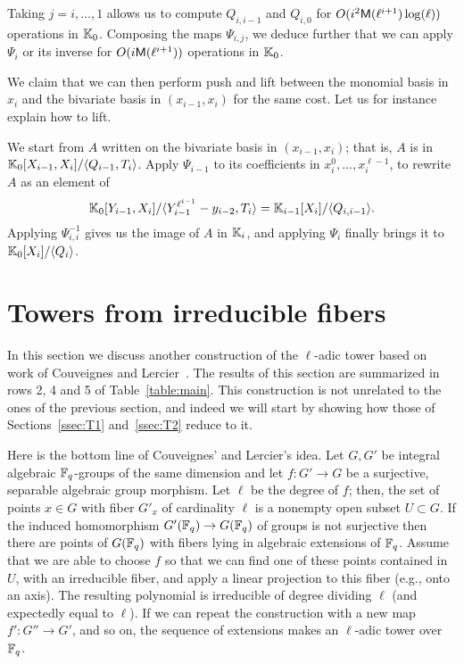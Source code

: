 \documentclass{sig-alternate}
\begin{document}
Taking $j=i,\dots,1$ allows us to compute $Q_{i,i-1}$ and $Q_{i,0}$
for $O(i^2\mathsf{M}(\ell^{i+1})\log(\ell))$ operations in $\mathbb{K}_0$. Composing
the maps $\Psi_{i,j}$, we deduce further that we can apply $\Psi_i$ or
its inverse for $O(i\mathsf{M}(\ell^{i+1}))$ operations in $\mathbb{K}_0$.  

We claim that we can then perform push and lift between the monomial
basis in $x_i$ and the bivariate basis in $(x_{i-1},x_i)$ for the same
cost. Let us for instance explain how to lift.

We start from $A$ written on the bivariate basis in $(x_{i-1},x_i)$;
that is, $A$ is in $\mathbb{K}_0[X_{i-1},X_i]/\langle Q_{i-1},
T_{i}\rangle$. Apply $\Psi_{i-1}$ to its coefficients in
$x_i^0,\dots,x_i^{\ell-1}$, to rewrite $A$ as an element of
$$\mathbb{K}_0[Y_{i-1},X_i]/\langle Y_{i-1}^{\ell^{i-1}}-y_{i-2},
T_{i}\rangle = \mathbb{K}_{i-1}[X_i]/\langle Q_{i,i-1} \rangle.$$ Applying
$\Psi_{i,i}^{-1}$ gives us the image of $A$ in $\mathbb{K}_i$, and applying
$\Psi_i$ finally brings it to $\mathbb{K}_0[X_i]/\langle Q_{i}\rangle$.



\section{Towers from irreducible fibers}
\label{sec:fibers}

In this section we discuss another construction of the $\ell$-adic
tower based on work of Couveignes and
Lercier~\cite{couveignes+lercier11}. The results of this section are
summarized in rows 2, 4 and 5 of Table~\ref{table:main}. This
construction is not unrelated to the ones of the previous section, and
indeed we will start by showing how those of Sections~\ref{ssec:T1}
and~\ref{ssec:T2} reduce to it.

Here is the bottom line of Couveignes' and Lercier's idea. Let $G, G'$
be integral algebraic $\mathbb{F}_q$-groups of the same dimension and let $f:
G' \rightarrow G$ be a surjective, separable algebraic group morphism.
Let $\ell$ be the degree of $f$; then, the set of points $x \in G$
with fiber $G'_x$ of cardinality $\ell$ is a nonempty open subset $U
\subset G$. If the induced homomorphism $G'(\mathbb{F}_q) \rightarrow G(\mathbb{F}_q)$
of groups is not surjective then there are points of $G(\mathbb{F}_q)$ with
fibers lying in algebraic extensions of $\mathbb{F}_q$. Assume that we are
able to choose $f$ so that we can find one of these points contained
in $U$, with an irreducible fiber, and apply a linear projection to
this fiber (e.g., onto an axis). The resulting polynomial is
irreducible of degree dividing $\ell$ (and expectedly equal to
$\ell$). If we can repeat the construction with a new map $f':G''\to
G'$, and so on, the sequence of extensions makes an $\ell$-adic tower
over $\mathbb{F}_q$.
\end{document}
